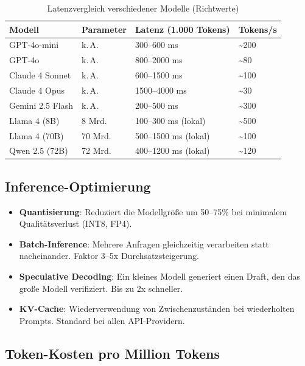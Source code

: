 \begin{table}[H]
\centering
\begin{tabularx}{\linewidth}{lXXX}
\toprule
\textbf{Modell} & \textbf{Parameter} & \textbf{Latenz (1.000 Tokens)} & \textbf{Tokens/s} \\
\midrule
GPT-4o-mini & k.\,A. & 300--600 ms & \~{}200 \\
GPT-4o & k.\,A. & 800--2000 ms & \~{}80 \\
Claude 4 Sonnet & k.\,A. & 600--1500 ms & \~{}100 \\
Claude 4 Opus & k.\,A. & 1500--4000 ms & \~{}30 \\
Gemini 2.5 Flash & k.\,A. & 200--500 ms & \~{}300 \\
Llama 4 (8B) & 8 Mrd. & 100--300 ms (lokal) & \~{}500 \\
Llama 4 (70B) & 70 Mrd. & 500--1500 ms (lokal) & \~{}100 \\
Qwen 2.5 (72B) & 72 Mrd. & 400--1200 ms (lokal) & \~{}120 \\
\bottomrule
\end{tabularx}
\caption{Latenzvergleich verschiedener Modelle (Richtwerte)}
\label{tab:model-latenz}
\end{table}

\subsection{Inference-Optimierung}

\begin{itemize}[leftmargin=*]
    \item \textbf{Quantisierung}: Reduziert die Modellgröße um 50--75\% bei minimalem Qualitätsverlust (INT8, FP4).
    \item \textbf{Batch-Inference}: Mehrere Anfragen gleichzeitig verarbeiten statt nacheinander. Faktor 3--5x Durchsatzsteigerung.
    \item \textbf{Speculative Decoding}: Ein kleines Modell generiert einen Draft, den das große Modell verifiziert. Bis zu 2x schneller.
    \item \textbf{KV-Cache}: Wiederverwendung von Zwischenzuständen bei wiederholten Prompts. Standard bei allen API-Providern.
\end{itemize}

\subsection{Token-Kosten pro Million Tokens}

